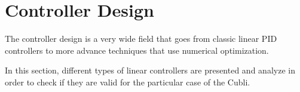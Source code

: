 \chapter{Controller Design}\label{chap:controllerDesign}
The controller design is a very wide field that goes from classic linear PID controllers to more advance techniques that use numerical optimization.

In this section, different types of linear controllers are presented and analyze in order to check if they are valid for the particular case of the Cubli. 